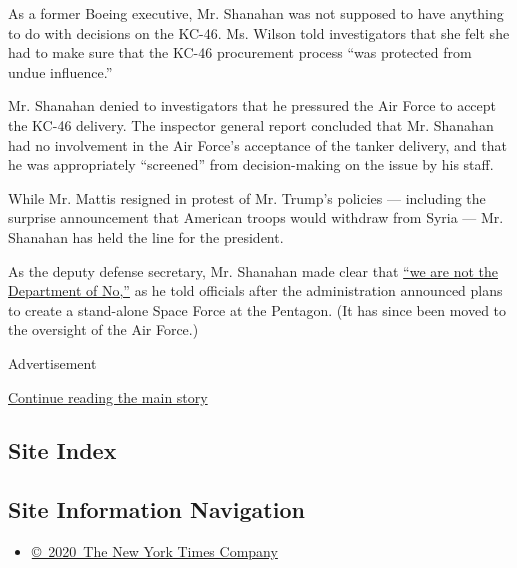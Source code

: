 As a former Boeing executive, Mr. Shanahan was not supposed to have
anything to do with decisions on the KC-46. Ms. Wilson told
investigators that she felt she had to make sure that the KC-46
procurement process ``was protected from undue influence.''

Mr. Shanahan denied to investigators that he pressured the Air Force to
accept the KC-46 delivery. The inspector general report concluded that
Mr. Shanahan had no involvement in the Air Force's acceptance of the
tanker delivery, and that he was appropriately ``screened'' from
decision-making on the issue by his staff.

While Mr. Mattis resigned in protest of Mr. Trump's policies ---
including the surprise announcement that American troops would withdraw
from Syria --- Mr. Shanahan has held the line for the president.

As the deputy defense secretary, Mr. Shanahan made clear that
\href{https://www.nytimes.com/2018/12/24/us/politics/patrick-shanahan-defense-secretary.html}{``we
are not the Department of No,''} as he told officials after the
administration announced plans to create a stand-alone Space Force at
the Pentagon. (It has since been moved to the oversight of the Air
Force.)

Advertisement

\protect\hyperlink{after-bottom}{Continue reading the main story}

\hypertarget{site-index}{%
\subsection{Site Index}\label{site-index}}

\hypertarget{site-information-navigation}{%
\subsection{Site Information
Navigation}\label{site-information-navigation}}

\begin{itemize}
\tightlist
\item
  \href{https://help.nytimes.com/hc/en-us/articles/115014792127-Copyright-notice}{©~2020~The
  New York Times Company}
\end{itemize}


